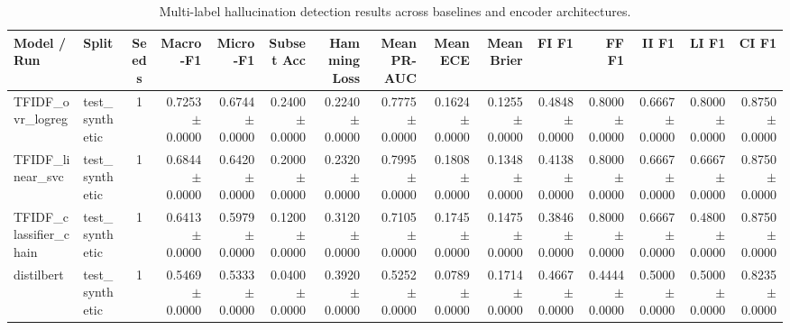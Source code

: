 \begin{table}[t]
\centering
\small
\begin{tabular}{llcrrrrrrrrrrrr}
\toprule
Model / Run & Split & Seeds & Macro-F1 & Micro-F1 & Subset Acc & Hamming Loss & Mean PR-AUC & Mean ECE & Mean Brier & FI F1 & FF F1 & II F1 & LI F1 & CI F1 \\
\midrule
TFIDF\_ovr\_logreg & test\_synthetic & 1 & 0.7253 $\pm$ 0.0000 & 0.6744 $\pm$ 0.0000 & 0.2400 $\pm$ 0.0000 & 0.2240 $\pm$ 0.0000 & 0.7775 $\pm$ 0.0000 & 0.1624 $\pm$ 0.0000 & 0.1255 $\pm$ 0.0000 & 0.4848 $\pm$ 0.0000 & 0.8000 $\pm$ 0.0000 & 0.6667 $\pm$ 0.0000 & 0.8000 $\pm$ 0.0000 & 0.8750 $\pm$ 0.0000 \\
TFIDF\_linear\_svc & test\_synthetic & 1 & 0.6844 $\pm$ 0.0000 & 0.6420 $\pm$ 0.0000 & 0.2000 $\pm$ 0.0000 & 0.2320 $\pm$ 0.0000 & 0.7995 $\pm$ 0.0000 & 0.1808 $\pm$ 0.0000 & 0.1348 $\pm$ 0.0000 & 0.4138 $\pm$ 0.0000 & 0.8000 $\pm$ 0.0000 & 0.6667 $\pm$ 0.0000 & 0.6667 $\pm$ 0.0000 & 0.8750 $\pm$ 0.0000 \\
TFIDF\_classifier\_chain & test\_synthetic & 1 & 0.6413 $\pm$ 0.0000 & 0.5979 $\pm$ 0.0000 & 0.1200 $\pm$ 0.0000 & 0.3120 $\pm$ 0.0000 & 0.7105 $\pm$ 0.0000 & 0.1745 $\pm$ 0.0000 & 0.1475 $\pm$ 0.0000 & 0.3846 $\pm$ 0.0000 & 0.8000 $\pm$ 0.0000 & 0.6667 $\pm$ 0.0000 & 0.4800 $\pm$ 0.0000 & 0.8750 $\pm$ 0.0000 \\
distilbert & test\_synthetic & 1 & 0.5469 $\pm$ 0.0000 & 0.5333 $\pm$ 0.0000 & 0.0400 $\pm$ 0.0000 & 0.3920 $\pm$ 0.0000 & 0.5252 $\pm$ 0.0000 & 0.0789 $\pm$ 0.0000 & 0.1714 $\pm$ 0.0000 & 0.4667 $\pm$ 0.0000 & 0.4444 $\pm$ 0.0000 & 0.5000 $\pm$ 0.0000 & 0.5000 $\pm$ 0.0000 & 0.8235 $\pm$ 0.0000 \\
\bottomrule
\end{tabular}
\caption{Multi-label hallucination detection results across baselines and encoder architectures.}
\label{tab:main_comparison}
\end{table}
